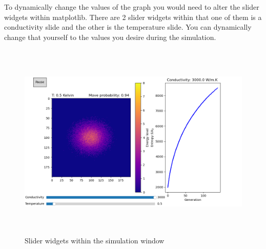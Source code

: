 \vspace{0.3cm}
\noindent
To dynamically change the values of the graph you would need to alter the slider widgets within matplotlib. There are 2 slider widgets within that one of them is a conductivity slide and the other is the temperature slide. You can dynamically change that yourself to the values you desire during the simulation. \par
\begin{figure}[H]
    \centering
    \includegraphics[height=9.5cm,width=15cm]{images/Slider_example.png}
    \caption{Slider widgets within the simulation window}
    \label{fig:dyamic_slide}
\end{figure}
